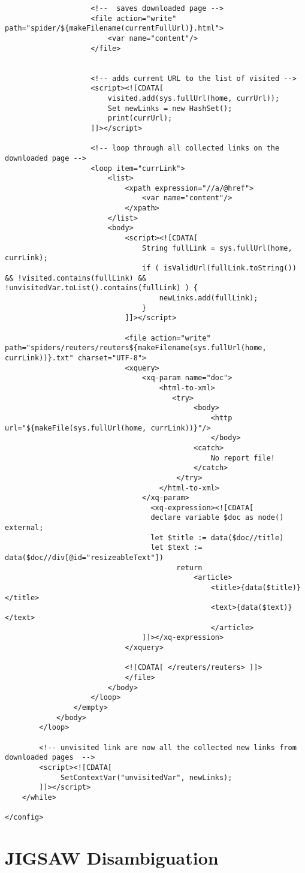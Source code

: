 \begin{lstlisting}
                    <!--  saves downloaded page -->
                    <file action="write" path="spider/${makeFilename(currentFullUrl)}.html">
                        <var name="content"/>
                    </file>
	                    

                    <!-- adds current URL to the list of visited -->
                    <script><![CDATA[
                        visited.add(sys.fullUrl(home, currUrl));
                        Set newLinks = new HashSet();
                        print(currUrl);
                    ]]></script>

                    <!-- loop through all collected links on the downloaded page -->
                    <loop item="currLink">
                        <list>
                            <xpath expression="//a/@href">
                                <var name="content"/>
                            </xpath>
                        </list>
                        <body>
                            <script><![CDATA[
                                String fullLink = sys.fullUrl(home, currLink);
                                if ( isValidUrl(fullLink.toString()) && !visited.contains(fullLink) && !unvisitedVar.toList().contains(fullLink) ) {
                                    newLinks.add(fullLink);
                                }
                            ]]></script>
                            
                            <file action="write" path="spiders/reuters/reuters${makeFilename(sys.fullUrl(home, currLink))}.txt" charset="UTF-8">
                            <xquery>
	                            <xq-param name="doc">
	                        		<html-to-xml>
					                   <try>
				        					<body>
	                          		  			<http url="${makeFile(sys.fullUrl(home, currLink))}"/>
	                          		  			</body>
									        <catch>
									            No report file!
									        </catch>
									    </try>
	                        		</html-to-xml>
	                    		</xq-param>
			                      <xq-expression><![CDATA[
			                      declare variable $doc as node() external;
                  			      let $title := data($doc//title)
                  			      let $text := data($doc//div[@id="resizeableText"])
			                            return
			                                <article>
			                                    <title>{data($title)}</title>
								    			<text>{data($text)}</text>
    			                                </article>
			                    ]]></xq-expression>
			                </xquery>
			                
			                <![CDATA[ </reuters/reuters> ]]>
			                </file>
                        </body>
                    </loop>
                </empty>
            </body>
        </loop>

        <!-- unvisited link are now all the collected new links from downloaded pages  -->
        <script><![CDATA[
             SetContextVar("unvisitedVar", newLinks);
        ]]></script>
    </while>

</config>
\end{lstlisting}

\section{JIGSAW Disambiguation}
\label{jigsaw}

